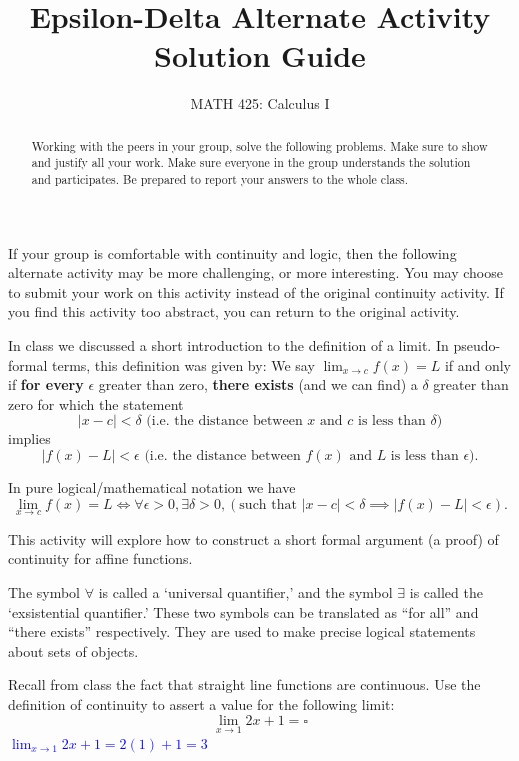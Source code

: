 \documentclass{ximera}
\title{Epsilon-Delta Alternate Activity Solution Guide}
\author{MATH 425: Calculus I}
\begin{document}
\begin{abstract}
   Working with the peers in your group, solve the following problems. Make sure to show and justify all your work. Make sure everyone in the group understands the solution and participates. Be prepared to report your answers to the whole class. 
\end{abstract}
\maketitle

If your group is comfortable with continuity and logic, then the following alternate activity may be more challenging, or more interesting.  You may choose to submit your work on this activity instead of the original continuity activity.  If you find this activity too abstract, you can return to the original activity. \\

\begin{definition}
    In class we discussed a short introduction to the definition of a limit.  In pseudo-formal terms, this definition was given by:
    We say $\lim_{x\rightarrow c}f(x)=L$ if and only if \textbf{for every} $\epsilon$ greater than zero, \textbf{there exists} (and we can find) a $\delta$ greater than zero for which the statement
        \[|x-c|<\delta \text{  (i.e. the distance between $x$ and $c$ is less than $\delta$)}\] 
    implies
        \[|f(x)-L|<\epsilon \text{  (i.e. the distance between $f(x)$ and $L$ is less than $\epsilon$)}.\] 

    In pure logical/mathematical notation we have 
    \[\lim_{x\rightarrow c}f(x)=L \iff \forall \epsilon>0, \exists \delta>0, (\text{such that } |x-c|<\delta \implies |f(x)-L|<\epsilon).\]
\end{definition}

This activity will explore how to construct a short formal argument (a proof) of continuity for affine functions.

\begin{remark}
    The symbol $\forall$ is called a `universal quantifier,' and the symbol $\exists$ is called the `exsistential quantifier.'  These two symbols can be translated as ``for all'' and ``there exists'' respectively.  They are used to make precise logical statements about sets of objects.
\end{remark}

\begin{exercise}
    Recall from class the fact that straight line functions are continuous.  Use the definition of continuity to assert a value for the following limit:
    \[\lim_{x\rightarrow 1}2x+1=\square\]
    \textcolor{blue}{$\lim_{x\rightarrow 1}2x+1=2(1)+1=3$}
\end{exercise}
\end{document}
